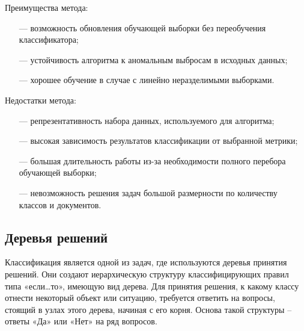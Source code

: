 Преимущества метода:
\begin{itemize}
	\item[---] возможность обновления обучающей выборки без переобучения классификатора;
	\item[---] устойчивость алгоритма к аномальным выбросам в исходных данных;
	\item[---] хорошее обучение в случае с линейно неразделимыми выборками.	
\end{itemize}

Недостатки метода:
\begin{itemize}
	\item[---] репрезентативность набора данных, используемого для алгоритма;
	\item[---] высокая зависимость результатов классификации от выбранной метрики;
	\item[---] большая длительность работы из-за необходимости полного перебора обучающей выборки;
	\item[---] невозможность решения задач большой размерности по количеству классов и документов.

\end{itemize}

\subsection{Деревья решений}

Классификация является одной из задач, где используются деревья
принятия решений. Они создают иерархическую структуру классифицирующих правил типа «если…то», имеющую вид дерева. Для принятия решения, к какому классу отнести некоторый объект или ситуацию, требуется ответить на вопросы, стоящий в узлах этого дерева, начиная с его корня. Основа такой структуры -- ответы «Да» или «Нет» на ряд вопросов.

